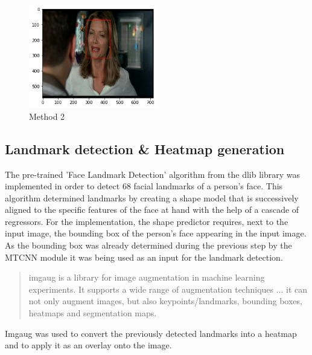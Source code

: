 \begin{center}
\begin{figure}[H]
  \begin{center}
  \includegraphics[angle=0, width=0.5\textwidth]{Figures/method_2.png}
  \caption{Method 2}
  \label{fig:MachineLearningModelMethod_2}
  \end{center}
\end{figure}
\end{center}

\subsection{Landmark detection \& Heatmap generation}
The pre-trained 'Face Landmark Detection' algorithm \citep{Kazemi:2014:ShapePredictor} from the dlib library was implemented in order to detect 68 facial landmarks of a person's face. This algorithm determined landmarks by creating a shape model that is successively aligned to the specific features of the face at hand with the help of a cascade of regressors.
\newline\newline
For the implementation, the shape predictor requires, next to the input image, the bounding box of the person's face appearing in the input image. As the bounding box was already determined during the previous step by the \gls{MTCNN} module it was being used as an input for the landmark detection. \citep{Datahacker:2020:DlibFacialLandmarks}
\newline\newline

\begin{quote}
    imgaug is a library for image augmentation in machine learning experiments. It supports a wide range of augmentation techniques ... it can not only augment images, but also keypoints/landmarks, bounding boxes, heatmaps and segmentation maps. \citep[~para. 1]{Jung:2020:Imgaug}
\end{quote}
Imgaug was used to convert the previously detected landmarks into a heatmap and to apply it as an overlay onto the image.

